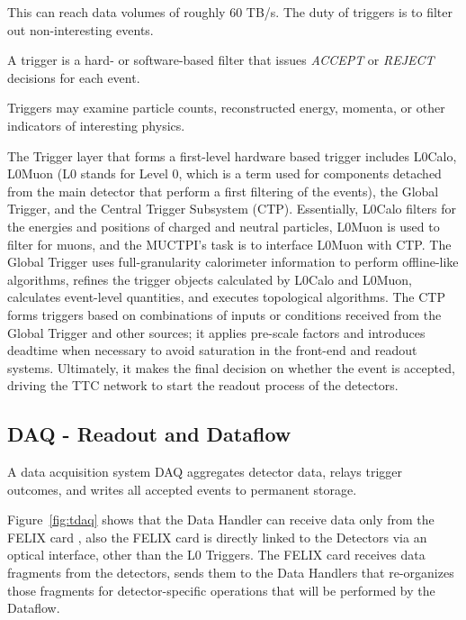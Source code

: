 This can reach data volumes of roughly 60 TB/s. The duty of triggers is to filter out non-interesting events.

\begin{definition}
\label{def:trigger}
A trigger is a hard- or software-based filter that issues \emph{ACCEPT} or \emph{REJECT} decisions for each event.
\end{definition}

Triggers may examine particle counts, reconstructed energy, momenta, or other indicators of interesting physics.

The Trigger layer that forms a first-level hardware based trigger includes \cite{tdaq} \acs{L0Calo}, \acs{L0Muon} (\acs{L0} stands for Level 0, which is a term used for components detached from the main detector that perform a first filtering of the events), the Global Trigger, and the Central Trigger Subsystem (\acs{CTP}). Essentially, \acs{L0Calo} filters for the energies and positions of charged and neutral particles, \acs{L0Muon} is used to filter for muons, and the \acs{MUCTPI}'s task is to interface \acs{L0Muon} with \acs{CTP}. The Global Trigger \cite{tdaq} uses full-granularity calorimeter information to perform offline-like algorithms, refines the trigger objects calculated by \acs{L0Calo} and \acs{L0Muon}, calculates event-level quantities, and executes topological algorithms. The \acs{CTP} \cite{tdaq} forms triggers based on combinations of inputs or conditions received from the Global Trigger and other sources; it applies pre-scale factors and introduces deadtime when necessary to avoid saturation in the front-end and readout systems. Ultimately, it makes the final decision on whether the event is accepted, driving the \acs{TTC} network to start the readout process of the detectors.

\subsection{\acs{DAQ} - Readout and Dataflow}
\label{subsec:daq}

\begin{definition}
\label{def:daq}
A data acquisition system \acs{DAQ} aggregates detector data, relays trigger outcomes, and writes all accepted events to permanent storage.
\end{definition}

Figure~\ref{fig:tdaq} shows that the Data Handler can receive data only from the \acs{FELIX} card \cite{tdaq}, also the \acs{FELIX} card is directly linked to the Detectors via an optical interface, other than the \acs{L0} Triggers. The \acs{FELIX} card receives data fragments from the detectors, sends them to the Data Handlers that re-organizes those fragments for detector-specific operations that will be performed by the Dataflow.

